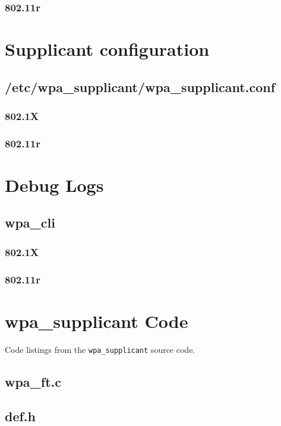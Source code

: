 \subsubsection{802.11r}



\section{Supplicant configuration}
\label{sec:Code;sub:supplicant}

\subsection{/etc/wpa\_supplicant/wpa\_supplicant.conf}
\subsubsection{802.1X}


\subsubsection{802.11r}


\section{Debug Logs}
\subsection{wpa\_cli}
\subsubsection{802.1X}


\subsubsection{802.11r}


\section{wpa\_supplicant Code}
Code listings from the \verb`wpa_supplicant` source code.
\subsection{wpa\_ft.c}

\subsection{def.h}
